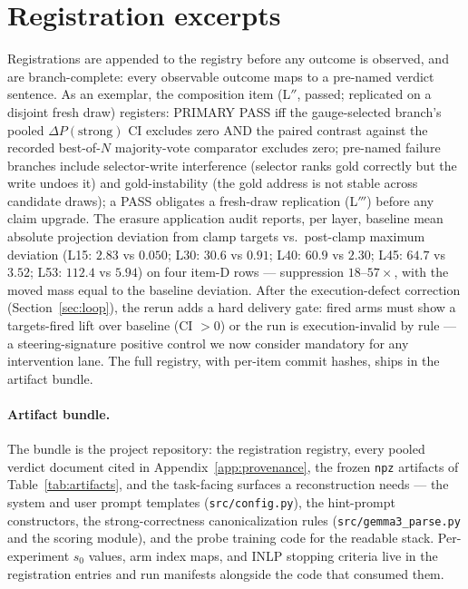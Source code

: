 \documentclass{article} %
\begin{document}
\section{Registration excerpts}\label{app:prereg}

Registrations are appended to the registry before any outcome is
observed, and are branch-complete: every observable outcome maps to a
pre-named verdict sentence. As an exemplar, the composition item
(L$''$, passed; replicated on a disjoint fresh draw)
registers: PRIMARY PASS iff the
gauge-selected branch's pooled $\Delta P(\text{strong})$ CI excludes zero
AND the paired contrast against the recorded best-of-$N$ majority-vote
comparator excludes zero; pre-named failure branches include
selector-write interference (selector ranks gold correctly but the write
undoes it) and gold-instability (the gold address is not stable across
candidate draws); a PASS obligates a fresh-draw replication (L$'''$)
before any claim upgrade. The erasure application audit reports, per layer, baseline mean
absolute projection deviation from clamp targets vs.\ post-clamp
maximum deviation (L15: $2.83$ vs $0.050$; L30: $30.6$ vs $0.91$;
L40: $60.9$ vs $2.30$; L45: $64.7$ vs $3.52$; L53: $112.4$ vs
$5.94$) on four item-D rows --- suppression $18$--$57\times$, with
the moved mass equal to the baseline deviation. After the
execution-defect correction
(Section~\ref{sec:loop}), the rerun adds a hard delivery gate:
fired arms must show a targets-fired lift over baseline (CI $>0$) or
the run is execution-invalid by rule --- a steering-signature positive
control we now consider mandatory for any intervention lane. The full
registry, with per-item commit hashes,
ships in the artifact bundle.

\paragraph{Artifact bundle.} The bundle is the project repository:
the registration registry, every pooled verdict document cited in
Appendix~\ref{app:provenance}, the frozen \texttt{npz} artifacts of
Table~\ref{tab:artifacts}, and the task-facing surfaces a
reconstruction needs --- the system and user prompt templates
(\texttt{src/config.py}), the hint-prompt constructors, the
strong-correctness canonicalization rules
(\texttt{src/gemma3\_parse.py} and the scoring module), and the probe
training code for the readable stack. Per-experiment $s_0$ values, arm
index maps, and INLP stopping criteria live in the registration
entries and run manifests alongside the code that consumed them.
\end{document}
